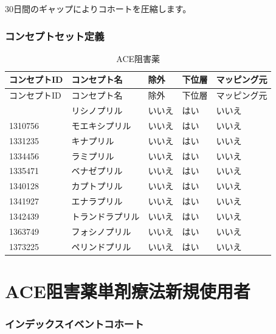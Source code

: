 \documentclass[
  11pt]{book}
\theoremstyle{definition}
\theoremstyle{definition}
\theoremstyle{definition}
\theoremstyle{definition}
\theoremstyle{remark}
\begin{document}
30日間のギャップによりコホートを圧縮します。

\subsubsection*{コンセプトセット定義}\label{ux30b3ux30f3ux30bbux30d7ux30c8ux30bbux30c3ux30c8ux5b9aux7fa9}

\begin{longtable}[]{@{}lllll@{}}
\caption{\label{tab:aceInhibitors} ACE阻害薬}\tabularnewline
\toprule\noalign{}
コンセプトID & コンセプト名 & 除外 & 下位層 & マッピング元 \\
\midrule\noalign{}
\endfirsthead
\toprule\noalign{}
コンセプトID & コンセプト名 & 除外 & 下位層 & マッピング元 \\
\midrule\noalign{}
\endhead
\bottomrule\noalign{}
\endlastfoot
1308216 & リシノプリル & いいえ & はい & いいえ \\
1310756 & モエキシプリル & いいえ & はい & いいえ \\
1331235 & キナプリル & いいえ & はい & いいえ \\
1334456 & ラミプリル & いいえ & はい & いいえ \\
1335471 & ベナゼプリル & いいえ & はい & いいえ \\
1340128 & カプトプリル & いいえ & はい & いいえ \\
1341927 & エナラプリル & いいえ & はい & いいえ \\
1342439 & トランドラプリル & いいえ & はい & いいえ \\
1363749 & フォシノプリル & いいえ & はい & いいえ \\
1373225 & ペリンドプリル & いいえ & はい & いいえ \\
\end{longtable}

\section{ACE阻害薬単剤療法新規使用者}\label{AceInhibitorsMono}

\subsubsection*{インデックスイベントコホート}\label{ux30a4ux30f3ux30c7ux30c3ux30afux30b9ux30a4ux30d9ux30f3ux30c8ux30b3ux30dbux30fcux30c8-1}
\end{document}
